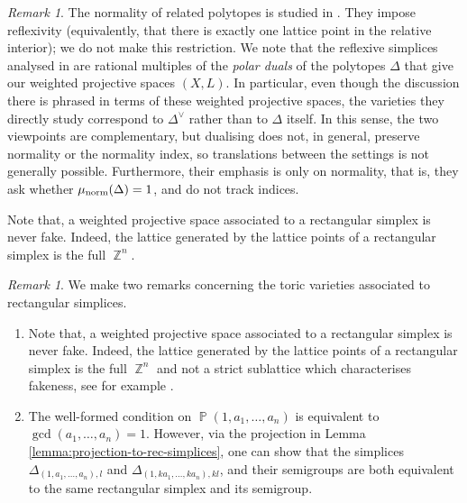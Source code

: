 \documentclass[a4paper,11pt]{amsart}
\theoremstyle{plain}
\theoremstyle{definition}
\theoremstyle{remark}
\newtheorem{remark}[theorem]{Remark}
\DeclareMathOperator{\ZZ}{\mathbb{Z}}
\DeclareMathOperator{\PP}{\mathbb{P}}
\DeclareMathOperator{\munorm}{\mu_{\text norm}}
\begin{document}
\begin{remark}
    The normality of related polytopes is studied in \cite{BraunDavisSolus:2018,BraunDavisHanelySolus:2024}.
    They impose reflexivity (equivalently, that there is exactly one lattice point in the relative interior); we do not make this restriction.
    We note that the reflexive simplices analysed in \cite{BraunDavisSolus:2018,BraunDavisHanelySolus:2024} are rational multiples of the \emph{polar duals} of the polytopes $\Delta$ that give our weighted projective spaces $(X,L)$.
    In particular, even though the discussion there is phrased in terms of these weighted projective spaces, the varieties they directly study correspond to $\Delta^\vee$ rather than to $\Delta$ itself.
    In this sense, the two viewpoints are complementary, but dualising does not, in general, preserve normality or the normality index, so translations between the settings is not generally possible.
    Furthermore, their emphasis is only on normality, that is, they ask whether $\munorm(\Delta)=1$, and do not track indices.
\end{remark}

Note that, a weighted projective space associated to a rectangular simplex is never fake.
Indeed, the lattice generated by the lattice points of a rectangular simplex is the full $\ZZ^n$.

\begin{remark}
    We make two remarks concerning the toric varieties associated to rectangular simplices.
    \begin{enumerate}
        \item Note that, a weighted projective space associated to a rectangular simplex is never fake.
        Indeed, the lattice generated by the lattice points of a rectangular simplex is the full $\ZZ^n$ and not a strict sublattice which characterises fakeness, see for example \cite{Kasprzyk:2009}.
        
        \item The well-formed condition on $\PP(1,a_1, \dots , a_n)$ is equivalent to $\gcd(a_1, \dots , a_n)=1$.
        However, via the projection in Lemma \ref{lemma:projection-to-rec-simplices}, one can show that the simplices $\Delta_{(1,a_1,\dots , a_n),l}$ and $\Delta_{(1,ka_1, \dots ,ka_n),kl}$, and their semigroups are both equivalent to the same rectangular simplex and its semigroup.
    \end{enumerate}
    
\end{remark}
\end{document}
